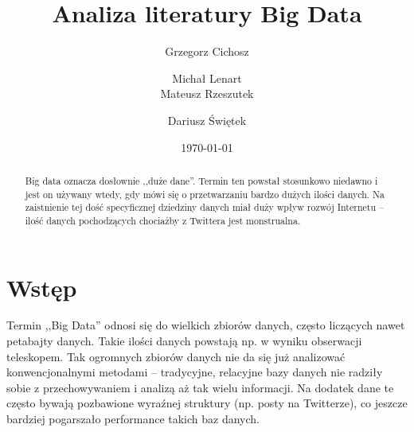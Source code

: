 \documentclass[twocolumn]{svjour3}          %
\begin{document}

\title{Analiza literatury Big Data}

\author{Grzegorz Cichosz \and
    Michał Lenart \\
    Mateusz Rzeszutek \and
    Dariusz Świętek
}


\date{\today}

\maketitle

\renewcommand{\abstractname}{Abstract}
\begin{abstract}
    Big data oznacza dosłownie ,,duże dane''. Termin ten powstał stosunkowo niedawno i jest on używany wtedy, gdy mówi się o przetwarzaniu bardzo dużych ilości danych. Na zaistnienie tej dość specyficznej dziedziny danych miał duży wpływ rozwój Internetu -- ilość danych pochodzących chociażby z Twittera jest monstrualna.
\end{abstract}


%
%

\section{Wstęp}
\label{sec:Wstep}

Termin ,,Big Data'' odnosi się do wielkich zbiorów danych, często liczących nawet petabajty danych. Takie ilości danych powstają np. w wyniku obserwacji teleskopem. Tak ogromnych zbiorów danych nie da się już analizować konwencjonalnymi metodami -- tradycyjne, relacyjne bazy danych nie radziły sobie z przechowywaniem i analizą aż tak wielu informacji. Na dodatek dane te często bywają pozbawione wyraźnej struktury (np. posty na Twitterze), co jeszcze bardziej pogarszało performance takich baz danych.
\end{document}
